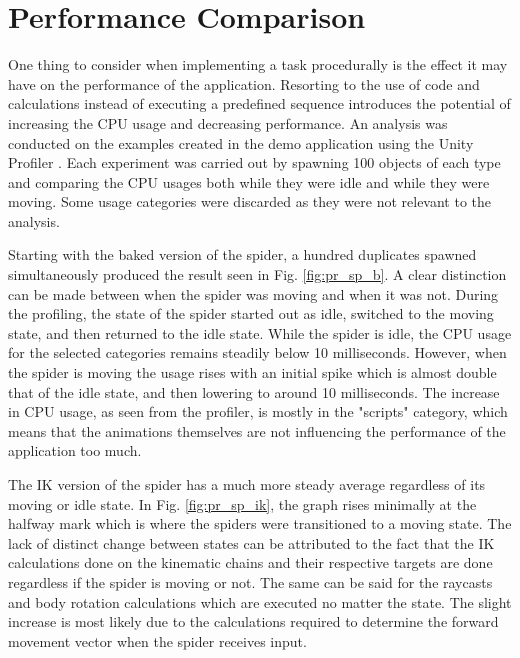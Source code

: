 \section{Performance Comparison}
One thing to consider when implementing a task procedurally is the
effect it may have on the performance of the application. Resorting to the use
of code and calculations instead of executing a predefined sequence introduces
the potential of increasing the CPU usage and decreasing performance. An
analysis was conducted on the examples created in the demo application using the
Unity Profiler \cite{unity_profiler}. Each experiment was carried out by
spawning 100 objects of each type and comparing the CPU usages both while they
were idle and while they were moving. Some usage categories were discarded as
they were not relevant to the analysis.


Starting with the baked version of the spider, a hundred duplicates spawned
simultaneously produced the result seen in Fig. \ref{fig:pr_sp_b}. A clear
distinction can be made between when the spider was moving and when it was not.
During the profiling, the state of the spider started out as idle, switched to
the moving state, and then returned to the idle state. While the spider is idle,
the CPU usage for the selected categories remains steadily below 10
milliseconds. However, when the spider is moving the usage rises with an initial
spike which is almost double that of the idle state, and then lowering to around
10 milliseconds. The increase in CPU usage, as seen from the profiler, is mostly
in the "scripts" category, which means that the animations themselves are not
influencing the performance of the application too much.

The IK version of the spider has a much more steady average regardless of its
moving or idle state. In Fig. \ref{fig:pr_sp_ik}, the graph rises minimally at the
halfway mark which is where the spiders were transitioned to a moving state.
The lack of distinct change between states can be attributed to the fact that
the IK calculations done on the kinematic chains and their respective targets
are done regardless if the spider is moving or not. The same can be said for the
raycasts and body rotation calculations which are executed no matter the state.
The slight increase is most likely due to the calculations required to determine
the forward movement vector when the spider receives input. 

